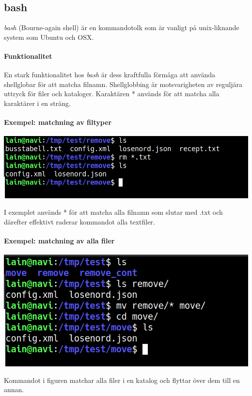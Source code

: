 \subsection{bash}
\emph{bash} (Bourne-again shell) är en kommandotolk som är vanligt på unix-liknande system som Ubuntu och OSX. 
\paragraph{Funktionalitet}
En stark funktionalitet hos \emph{bash} är dess kraftfulla förmåga att använda shellglobar för att matcha filnamn.
Shellglobbing är motsvarigheten av reguljära uttryck för filer och kataloger. Karaktären * används för att matcha alla karaktärer i en sträng.
\newpage
\paragraph{Exempel: matchning av filtyper}
\begin{center}
        \includegraphics[width=\linewidth]{bilder/bash_remove_filetype.png}
\end{center}
I exemplet används * för att matcha alla filnamn som slutar med .txt och därefter effektivt raderar kommandot alla textfiler.
\paragraph{Exempel: matchning av alla filer}
\begin{center}
        \includegraphics[width=\linewidth]{bilder/bash_move_files.png}
\end{center}
Kommandot i figuren matchar alla filer i en katalog och flyttar över dem till en annan.

